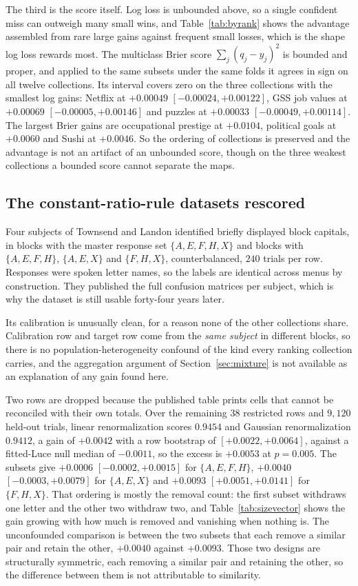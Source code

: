 \documentclass[11pt]{article}
\begin{document}
The third is the score itself. Log loss is unbounded above, so a single confident miss can
outweigh many small wins, and Table~\ref{tab:byrank} shows
the advantage assembled from rare large gains against frequent small losses, which is the shape
log loss rewards most. The multiclass Brier score $\sum_j (q_j - y_j)^2$ is bounded and proper,
and applied to the same subsets under the same folds it agrees in sign on all twelve
collections. Its interval covers zero on the three collections with the smallest log gains:
Netflix at $+0.00049$ $[-0.00024, +0.00122]$, GSS job values at $+0.00069$
$[-0.00005, +0.00146]$ and puzzles at $+0.00033$ $[-0.00049, +0.00114]$. The largest Brier gains
are occupational prestige at $+0.0104$, political goals at $+0.0060$ and Sushi at $+0.0046$. So
the ordering of collections is preserved and the advantage is not an artifact of an unbounded
score, though on the three weakest collections a bounded score cannot separate the maps.

\subsection{The constant-ratio-rule datasets rescored}
\label{sec:townsend}

Four subjects of Townsend and Landon \cite{townsendlandon1982} identified briefly displayed block capitals, in blocks with the
master response set $\{A,E,F,H,X\}$ and blocks with $\{A,E,F,H\}$, $\{A,E,X\}$ and
$\{F,H,X\}$, counterbalanced, $240$ trials per row. Responses were spoken letter names, so
the labels are identical across menus by construction. They published the full confusion
matrices per subject, which is why the dataset is still usable forty-four years later.

Its calibration is unusually clean, for a reason none of the other collections share.
Calibration row and target row come from the \emph{same subject} in different blocks, so
there is no population-heterogeneity confound of the kind every ranking collection carries,
and the aggregation argument of Section~\ref{sec:mixture} is not available as an
explanation of any gain found here.

Two rows are dropped because the published table prints cells that cannot be reconciled with
their own totals. Over the remaining $38$ restricted rows and $9{,}120$ held-out trials, linear
renormalization scores $0.9454$ and
Gaussian renormalization $0.9412$, a gain of $+0.0042$ with a row bootstrap of $[+0.0022, +0.0064]$, against
a fitted-Luce null median of $-0.0011$, so the excess is $+0.0053$ at $p = 0.005$. The
subsets give $+0.0006$ $[-0.0002, +0.0015]$ for $\{A,E,F,H\}$, $+0.0040$
$[-0.0003, +0.0079]$ for $\{A,E,X\}$ and $+0.0093$ $[+0.0051, +0.0141]$ for $\{F,H,X\}$.
That ordering is mostly the removal count: the first subset withdraws one letter and the
other two withdraw two, and Table~\ref{tab:sizevector} shows the gain growing with how much is
removed and vanishing when nothing is. The unconfounded comparison is between the
two subsets that each remove a similar pair and retain the other, $+0.0040$ against
$+0.0093$. Those two designs are structurally symmetric, each removing a similar pair and
retaining the other, so the difference between them is not attributable to similarity.
\end{document}
